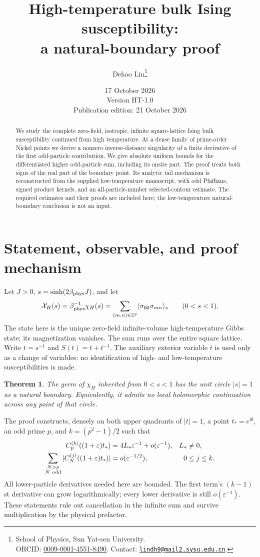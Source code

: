 \documentclass[11pt]{article}
\title{High-temperature bulk Ising susceptibility:\\a natural-boundary proof}
\author{Dehao Lin\thanks{\raggedright School of Physics, Sun Yat-sen University.\\ORCID: \href{https://orcid.org/0009-0001-4551-8490}{0009-0001-4551-8490}. Contact: \href{mailto:lindh9@mail2.sysu.edu.cn}{\texttt{lindh9@mail2.sysu.edu.cn}}.}}
\date{17 October 2026\\Version HT-1.0\\Publication edition: 21 October 2026}
\numberwithin{equation}{section}
\newtheorem{theorem}{Theorem}[section]
\theoremstyle{definition}
\newcommand{\ii}{\mathrm i}
\newcommand{\Z}{\mathbb Z}
\newcommand{\eps}{\varepsilon}
\begin{document}
\maketitle
\begin{abstract}
We study the complete zero-field, isotropic, infinite square-lattice
Ising bulk susceptibility continued from high temperature. At a dense
family of prime-order Nickel points we derive a nonzero inverse-distance
singularity of a finite derivative of the first odd-particle contribution.
We give absolute uniform bounds for the differentiated higher odd-particle
sum, including its onsite part. The proof treats both signs of the real
part of the boundary point. Its analytic tail mechanism is reconstructed
from the supplied low-temperature manuscript, with odd Pfaffians,
signed product kernels, and an all-particle-number selected-contour
estimate. The required estimates and their proofs are included here;
the low-temperature natural-boundary conclusion is not an input.
\end{abstract}

\section{Statement, observable, and proof mechanism}\label{sec:scope}
Let $J>0$, $s=\sinh(2\beta_{\rm phys}J)$, and let
\[
 \mathcal X_H(s)=\beta_{\rm phys}^{-1}\chi_H(s)
 =\sum_{(m,n)\in\Z^2}\langle\sigma_{00}\sigma_{mn}\rangle_s
 \qquad(0<s<1).
\]
The state here is the unique zero-field infinite-volume high-temperature
Gibbs state; its magnetization vanishes. The sum runs over the entire
square lattice. Write $t=s^{-1}$ and $S(t)=t+t^{-1}$. The auxiliary
exterior variable $t$ is used only as a change of variables: no
identification of high- and low-temperature susceptibilities is made.

\begin{theorem}\label{thm:main}
The germ of $\chi_H$ inherited from $0<s<1$ has the unit circle
$|s|=1$ as a natural boundary. Equivalently, it admits no local
holomorphic continuation across any point of that circle.
\end{theorem}

The proof constructs, densely on both upper quadrants of $|t|=1$,
a point $t_*=e^{\ii\theta}$, an odd prime $p$, and
$k=(p^2-1)/2$ such that
\begin{align}
 C_p^{(k)}((1+\eps)t_*)&=4L_*\eps^{-1}+o(\eps^{-1}),
       &L_*&\ne0,\label{eq:roadmapfirst}\\
 \sum_{\substack{N>p\\N\ {\rm odd}}}
 |C_N^{(j)}((1+\eps)t_*)|&=o(\eps^{-1/2}),
       &0&\le j\le k.\label{eq:roadmaptail}
\end{align}
All lower-particle derivatives needed here are bounded. The first term's
$(k-1)$st derivative can grow logarithmically; every lower derivative
is still $o(\eps^{-1})$. These statements rule out cancellation in the
infinite sum and survive multiplication by the physical prefactor.
\end{document}
